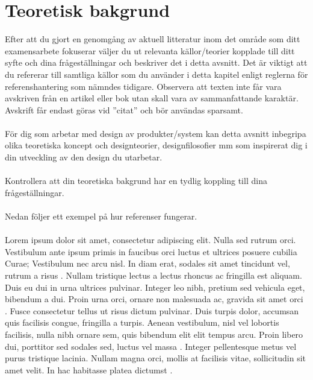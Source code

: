 \section{Teoretisk bakgrund}
Efter att du gjort en genomgång av aktuell litteratur inom det område som ditt examensarbete fokuserar väljer du ut relevanta källor/teorier kopplade till ditt syfte och dina frågeställningar och beskriver det i detta avsnitt. Det är viktigt att du refererar till samtliga källor som du använder i detta kapitel enligt reglerna för referenshantering som nämndes tidigare. Observera att texten inte får vara avskriven från en artikel eller bok utan skall vara av sammanfattande karaktär. Avskrift får endast göras vid ”citat” och bör användas sparsamt.\\ \\ 
För dig som arbetar med design av produkter/system kan detta avsnitt inbegripa olika teoretiska koncept och designteorier, designfilosofier  mm som inspirerat dig i din utveckling av den design du utarbetar. \\ \\
Kontrollera att din teoretiska bakgrund har en tydlig koppling till dina frågeställningar.
\\ \\
Nedan följer ett exempel på hur referenser fungerar.
\\ \\
Lorem ipsum dolor sit amet, consectetur adipiscing elit. Nulla sed rutrum orci. Vestibulum ante ipsum primis in faucibus orci luctus et ultrices posuere cubilia Curae; Vestibulum nec arcu nisl. In diam erat, sodales sit amet tincidunt vel, rutrum a risus \citep{latexcompanion}. Nullam tristique lectus a lectus rhoncus ac fringilla est aliquam. Duis eu dui in urna ultrices pulvinar. Integer leo nibh, pretium sed vehicula eget, bibendum a dui. Proin urna orci, ornare non malesuada ac, gravida sit amet orci \citet{einstein}. Fusce consectetur tellus ut risus dictum pulvinar. Duis turpis dolor, accumsan quis facilisis congue, fringilla a turpis. Aenean vestibulum, nisl vel lobortis facilisis, nulla nibh ornare sem, quis bibendum elit elit tempus arcu. Proin libero dui, porttitor sed sodales sed, luctus vel massa \citep{knuthwebsite}. Integer pellentesque metus vel purus tristique lacinia. Nullam magna orci, mollis at facilisis vitae, sollicitudin sit amet velit. In hac habitasse platea dictumst \citet{latexcompanion,knuthwebsite}. 
